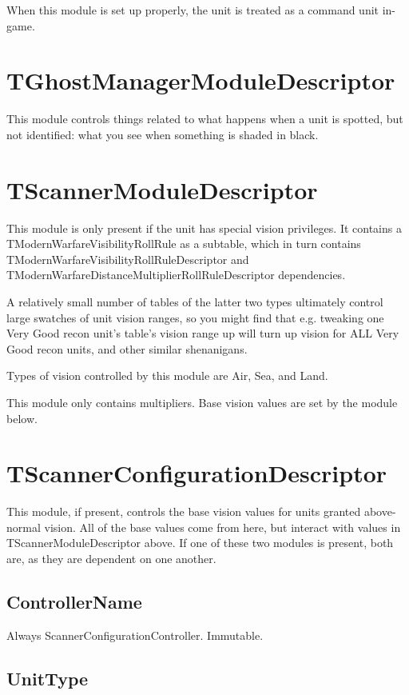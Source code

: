 \documentclass{article}
\begin{document}
When this module is set up properly, the unit is treated as a command unit in-game.

\section{TGhostManagerModuleDescriptor}

This module controls things related to what happens when a unit is spotted, but not identified: what you see when something is shaded in black. 

\section{TScannerModuleDescriptor}

This module is only present if the unit has special vision privileges. It contains a TModernWarfareVisibilityRollRule as a subtable, which in turn contains TModernWarfareVisibilityRollRuleDescriptor and TModernWarfareDistanceMultiplierRollRuleDescriptor dependencies.

A relatively small number of tables of the latter two types ultimately control large swatches of unit vision ranges, so you might find that e.g. tweaking one Very Good recon unit's table's vision range up will turn up vision for ALL Very Good recon units, and other similar shenanigans.

Types of vision controlled by this module are Air, Sea, and Land.

This module only contains multipliers. Base vision values are set by the module below.

\section{TScannerConfigurationDescriptor}

This module, if present, controls the base vision values for units granted above-normal vision. All of the base values come from here, but interact with values in TScannerModuleDescriptor above. If one of these two modules is present, both are, as they are dependent on one another.

\subsection{ControllerName}

Always ScannerConfigurationController. Immutable.

\subsection{UnitType}
\end{document}
